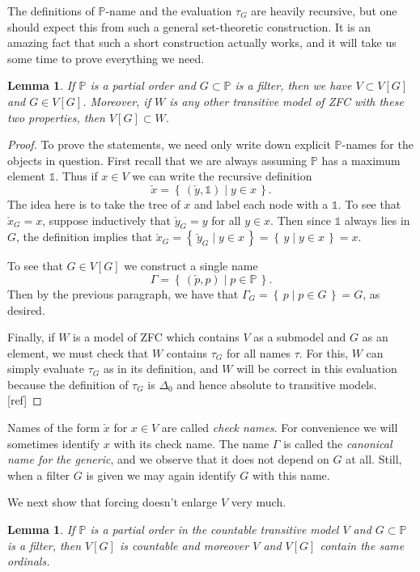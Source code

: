 \documentclass[11pt,oneside,a4paper]{amsbook}
\newcommand{\set}[1]{\left\{\,#1\,\right\}}
\newcommand{\PP}{\mathbb P}
\theoremstyle{definition}
\theoremstyle{plain}
\newtheorem{lemma}[theorem]{Lemma}
\theoremstyle{definition}
\theoremstyle{remark}
\numberwithin{equation}{section}
\numberwithin{figure}{section}
\begin{document}
The definitions of $\PP$-name and the evaluation $\tau_G$ are heavily recursive, but one should expect this from such a general set-theoretic construction. It is an amazing fact that such a short construction actually works, and it will take us some time to prove everything we need.

\begin{lemma}
  If $\PP$ is a partial order and $G\subset\mathbb P$ is a filter, then we have $V\subset V[G]$ and $G\in V[G]$. Moreover, if $W$ is any other transitive model of ZFC with these two properties, then $V[G]\subset W$.
\end{lemma}

\begin{proof}
  To prove the statements, we need only write down explicit $\PP$-names for the objects in question. First recall that we are always assuming $\PP$ has a maximum element $\mathbb 1$. Thus if $x\in V$ we can write the recursive definition
  \[\check x=\set{(\check y,\mathbb 1)\mid y\in x}\text{.}
  \]
  The idea here is to take the tree of $x$ and label each node with a $\mathbb 1$. To see that $\check x_G=x$, suppose inductively that $\check y_G=y$ for all $y\in x$. Then since $\mathbb 1$ always lies in $G$, the definition implies that $\check x_G=\set{\check y_G\mid y\in x}=\set{y\mid y\in x}=x$.

  To see that $G\in V[G]$ we construct a single name
  \[\Gamma=\set{(\check p,p)\mid p\in\PP}\text{.}
  \]
  Then by the previous paragraph, we have that $\Gamma_G=\set{p\mid p\in G}=G$, as desired.

  Finally, if $W$ is a model of ZFC which contains $V$ as a submodel and $G$ as an element, we must check that $W$ contains $\tau_G$ for all names $\tau$. For this, $W$ can simply evaluate $\tau_G$ as in its definition, and $W$ will be correct in this evaluation because the definition of $\tau_G$ is $\Delta_0$ and hence absolute to transitive models. [ref]
\end{proof}

Names of the form $\check x$ for $x\in V$ are called \emph{check names}. For convenience we will sometimes identify $x$ with its check name. The name $\Gamma$ is called the \emph{canonical name for the generic}, and we observe that it does not depend on $G$ at all. Still, when a filter $G$ is given we may again identify $G$ with this name.

We next show that forcing doesn't enlarge $V$ very much.

\begin{lemma}
  If $\mathbb P$ is a partial order in the countable transitive model $V$ and $G\subset\mathbb P$ is a filter, then $V[G]$ is countable and moreover $V$ and $V[G]$ contain the same ordinals.
\end{lemma}
\end{document}
